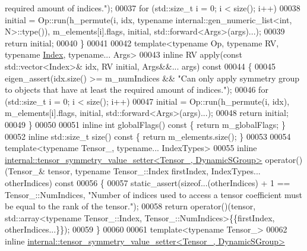 \begin{DoxyCode}
{       required amount of indices."});
00037       \textcolor{keywordflow}{for} (std::size\_t i = 0; i < size(); i++)
00038         initial = Op::run(h\_permute(i, idx, \textcolor{keyword}{typename} internal::gen\_numeric\_list<int, N>::type()), 
      m\_elements[i].flags, initial, std::forward<Args>(args)...);
00039       \textcolor{keywordflow}{return} initial;
00040     \}
00041 
00042     \textcolor{keyword}{template}<\textcolor{keyword}{typename} Op, \textcolor{keyword}{typename} RV, \textcolor{keyword}{typename} \hyperlink{namespace_eigen_a62e77e0933482dafde8fe197d9a2cfde}{Index}, \textcolor{keyword}{typename}... Args>
00043     \textcolor{keyword}{inline} RV apply(\textcolor{keyword}{const} std::vector<Index>& idx, RV initial, Args&&... args)\textcolor{keyword}{ const}
00044 \textcolor{keyword}{    }\{
00045       eigen\_assert(idx.size() >= m\_numIndices && \textcolor{stringliteral}{"Can only apply symmetry group to objects that have at
       least the required amount of indices."});
00046       \textcolor{keywordflow}{for} (std::size\_t i = 0; i < size(); i++)
00047         initial = Op::run(h\_permute(i, idx), m\_elements[i].flags, initial, std::forward<Args>(args)...);
00048       \textcolor{keywordflow}{return} initial;
00049     \}
00050 
00051     \textcolor{keyword}{inline} \textcolor{keywordtype}{int} globalFlags()\textcolor{keyword}{ const }\{ \textcolor{keywordflow}{return} m\_globalFlags; \}
00052     \textcolor{keyword}{inline} std::size\_t size()\textcolor{keyword}{ const }\{ \textcolor{keywordflow}{return} m\_elements.size(); \}
00053 
00054     \textcolor{keyword}{template}<\textcolor{keyword}{typename} Tensor\_, \textcolor{keyword}{typename}... IndexTypes>
00055     \textcolor{keyword}{inline} \hyperlink{class_eigen_1_1internal_1_1tensor__symmetry__value__setter}{internal::tensor\_symmetry\_value\_setter<Tensor\_, DynamicSGroup>}
       operator()(Tensor\_& tensor, \textcolor{keyword}{typename} Tensor\_::Index firstIndex, IndexTypes... otherIndices)\textcolor{keyword}{ const}
00056 \textcolor{keyword}{    }\{
00057       static\_assert(\textcolor{keyword}{sizeof}...(otherIndices) + 1 == Tensor\_::NumIndices, \textcolor{stringliteral}{"Number of indices used to access a
       tensor coefficient must be equal to the rank of the tensor."});
00058       \textcolor{keywordflow}{return} operator()(tensor, std::array<typename Tensor\_::Index, Tensor\_::NumIndices>\{\{firstIndex, 
      otherIndices...\}\});
00059     \}
00060 
00061     \textcolor{keyword}{template}<\textcolor{keyword}{typename} Tensor\_>
00062     \textcolor{keyword}{inline} \hyperlink{class_eigen_1_1internal_1_1tensor__symmetry__value__setter}{internal::tensor\_symmetry\_value\_setter<Tensor\_, DynamicSGroup>}

\end{DoxyCode}
